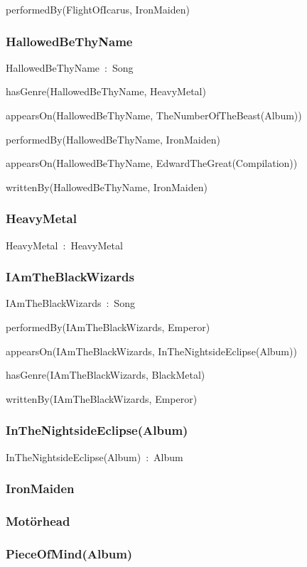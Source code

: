 \documentclass{article}
\begin{document}
performedBy(FlightOfIcarus, IronMaiden)

\subsubsection*{HallowedBeThyName}

HallowedBeThyName~:~Song

hasGenre(HallowedBeThyName, HeavyMetal)

appearsOn(HallowedBeThyName, TheNumberOfTheBeast(Album))

performedBy(HallowedBeThyName, IronMaiden)

appearsOn(HallowedBeThyName, EdwardTheGreat(Compilation))

writtenBy(HallowedBeThyName, IronMaiden)

\subsubsection*{HeavyMetal}

HeavyMetal~:~HeavyMetal

\subsubsection*{IAmTheBlackWizards}

IAmTheBlackWizards~:~Song

performedBy(IAmTheBlackWizards, Emperor)

appearsOn(IAmTheBlackWizards, InTheNightsideEclipse(Album))

hasGenre(IAmTheBlackWizards, BlackMetal)

writtenBy(IAmTheBlackWizards, Emperor)

\subsubsection*{InTheNightsideEclipse(Album)}

InTheNightsideEclipse(Album)~:~Album

\subsubsection*{IronMaiden}

\subsubsection*{Motörhead}

\subsubsection*{PieceOfMind(Album)}
\end{document}
